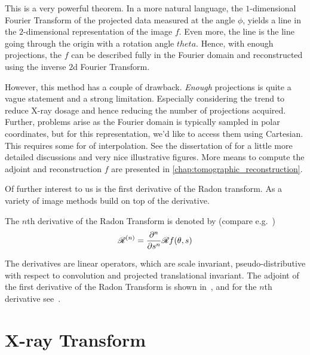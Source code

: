 This is a very powerful theorem. In a more natural language, the \(1\)-dimensional Fourier Transform
of the projected data measured at the angle \(\phi\), yields a line in the \(2\)-dimensional
representation of the image \(f\). Even more, the line is the line going through the origin with a
rotation angle \(theta\). Hence, with enough projections, the \(f\) can be described fully in the
Fourier domain and reconstructed using the inverse \(2\)d Fourier Transform.


However, this method has a couple of drawback. \textit{Enough} projections is quite a vague
statement and a strong limitation. Especially considering the trend to reduce X-ray dosage and hence
reducing the number of projections acquired. Further, problems arise as the Fourier domain is
typically sampled in polar coordinates, but for this representation, we'd like to access them using
Cartesian. This requires some for of interpolation. See the dissertation of
\citeauthor{vogel_tomographic_nodate}\cite[chap. 4.1.2]{vogel_tomographic_nodate} for a little more
detailed discussions and very nice illustrative figures. More means to compute the adjoint and
reconstruction \(f\) are presented in \autoref{chap:tomographic_reconstruction}.

Of further interest to us is the first derivative of the Radon transform. As a variety of image
methods build on top of the derivative.

\begin{definition}
	The \(n\)th derivative of the Radon Transform is denoted by (compare
	e.g.\ \cite{nilchian_differential_2012,nilchian_fast_2013})
	\[ \mathscr{R}^{(n)} = \frac{\partial^n}{\partial s^n} \mathscr{R} f(\theta, s)\]
\end{definition}

The derivatives are linear operators, which are scale invariant, pseudo-distributive with respect to
convolution and projected translational invariant. The adjoint of the first derivative of the Radon
Transform is shown in~\cite{nilchian_differential_2012}, and for the \(n\)th derivative
see~\cite{nilchian_fast_2013}.

\section{X-ray Transform}\label{sec:xray_transform}

